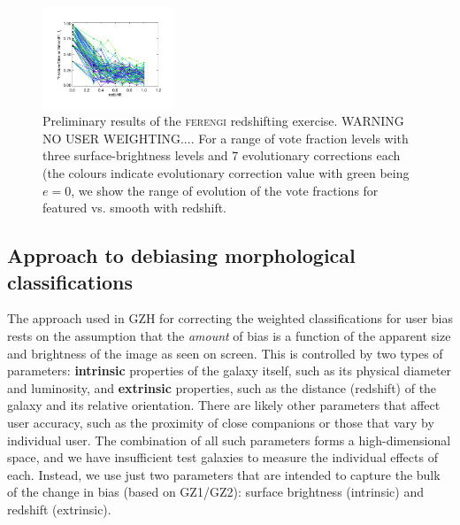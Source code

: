 \documentclass[usenatbib]{mn2e}
\newcommand{\ferengi}{\textsc{ferengi}}
\begin{document}
\begin{figure}
\begin{center}

\includegraphics[width=0.35\textwidth]{somewhat_fake_results.pdf}

\caption{Preliminary results of the \ferengi{} redshifting exercise. WARNING NO USER WEIGHTING.... For a range of vote fraction levels with three surface-brightness levels and 7 evolutionary corrections each (the colours indicate evolutionary correction value with green being $e=0$, we show the range of evolution of the vote fractions for featured vs. smooth with redshift.}

\label{fig:ferengi_results_fake}

\end{center}
\end{figure}

\subsection{Approach to debiasing morphological classifications}

The approach used in GZH for correcting the weighted classifications for user bias rests on the assumption that the \emph{amount} of bias is a function of the apparent size and brightness of the image as seen on screen. This is controlled by two types of parameters: \textbf{intrinsic} properties of the galaxy itself, such as its physical diameter and luminosity, and \textbf{extrinsic} properties, such as the distance (redshift) of the galaxy and its relative orientation. There are likely other parameters that affect user accuracy, such as the proximity of close companions \citep[``distraction bias''; see][]{joh15} or those that vary by individual user. The combination of all such parameters forms a high-dimensional space, and we have insufficient test galaxies to measure the individual effects of each. Instead, we use just two parameters that are intended to capture the bulk of the change in bias (based on GZ1/GZ2): surface brightness (intrinsic) and redshift (extrinsic). 
\end{document}

